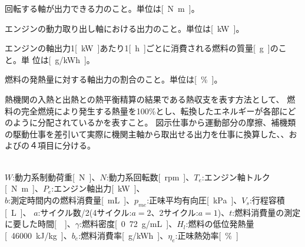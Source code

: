 \begin{description}
  \setlength{\parskip}{0cm} %
  \setlength{\itemsep}{0cm} %
  \item[軸トルク] 回転する軸が出力できる力のこと。単位は\si{[\newton\meter]}。
  \item[軸出力] エンジンの動力取り出し軸における出力のこと。単位は\si{[\kW]}。
  \item[燃料消費率] エンジンの軸出力1\si{[\kW]}あたり1\si{[\hour]}ごとに消費される燃料の質量\si{[\g]}のこと。単
  位は\si{[\g/\kWh]}。
  \item[正味熱効率] 燃料の発熱量に対する軸出力の割合のこと。単位は\si{[\%]}。
  \item[熱勘定] 熱機関の入熱と出熱との熱平衡精算の結果である熱収支を表す方法として、
  燃料の完全燃焼により発生する熱量を100\si{\%}とし、転換したエネルギーが各部にどのように分配されているかを表すこと。
  図示仕事から運動部分の摩擦、補機類の駆動仕事を差引いて実際に機関主軸から取出せる出力を仕事に換算した、、およびの４項目に分ける。\cite{kanjo}
\end{description}
\\
$W$:動力系制動荷重\si{[\newton]}、$N$:動力系回転数\si{[rpm]}、$T_e$:エンジン軸トルク\si{[\newton \meter]}、$P_e$:エンジン軸出力\si{[\kW]}、\\
$b$:測定時間内の燃料消費量\si{[\mL]}、$p_{me}$:正味平均有向圧\si{[\kPa]}、$V_s$:行程容積\si{[\L]}、
$a$:サイクル数/2(4サイクル:$a=2$、2サイクル:$a=1$)、$t$:燃料消費量の測定に要した時間\si{[\sec]}、$\gamma$:燃料密度\si{[0.72 \g/\mL]}、$H_l$:燃料の低位発熱量\si{[46000\kJ/\kg]}、$b_e$:燃料消費率\si{[\g/\kWh]}、$\eta_e$:正味熱効率\si{[\%]}
